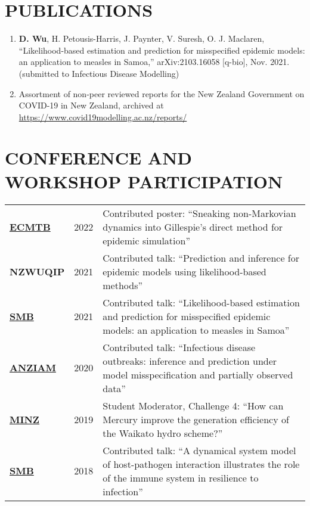\documentclass[paper=a4paper,fontsize=11pt]{scrartcl} %
\newlength{\spacebox}
\newcommand{\NewPart}[1]{\section*{\uppercase{#1}}}
\begin{document}
\NewPart{Publications}
\begin{enumerate}
    \item \textbf{D. Wu}, H. Petousis-Harris, J. Paynter, V. Suresh, O. J. Maclaren, ``Likelihood-based estimation and prediction for misspecified epidemic models: an application to measles in Samoa,'' arXiv:2103.16058 [q-bio], Nov. 2021. (submitted to Infectious Disease Modelling)
    \item Assortment of non-peer reviewed reports for the New Zealand Government on COVID-19 in New Zealand, archived at \url{https://www.covid19modelling.ac.nz/reports/}
\end{enumerate}

\NewPart{Conference and Workshop Participation}
\begin{tabular}{p{\spacebox} p{0.5\spacebox} p{6.7\spacebox}}
\hyperlink{https://ecmtb2022.org/}{\textbf{ECMTB}} & {2022} & {Contributed poster: ``Sneaking non-Markovian dynamics into Gillespie's direct method for epidemic simulation''}\\
\textbf{NZWUQIP} & {2021} & {Contributed talk: ``Prediction and inference for epidemic models using likelihood-based methods''}\\
\hyperlink{https://www.smb2021.org/}{\textbf{SMB}} & {2021} & {Contributed talk: ``Likelihood-based  estimation and prediction for misspecified epidemic models: an application to measles in Samoa''}\\
\hyperlink{http://www.maths.mq.edu.au/ANZIAM2020/}{\textbf{ANZIAM}} & {2020} & {Contributed talk: ``Infectious disease outbreaks: inference and prediction under model misspecification and partially observed data''}\\
\hyperlink{https://minz.org.nz/2019/}{\textbf{MINZ}} & {2019} & {Student Moderator, Challenge 4: ``How can Mercury improve the generation efficiency of the Waikato hydro scheme?''}\\
\hyperlink{http://conferences.science.unsw.edu.au/SMB2018/}{\textbf{SMB}} & {2018} & {Contributed talk: ``A dynamical system model of host-pathogen interaction illustrates the role of the immune system in resilience to infection''}\\
\end{tabular}
\end{document}
